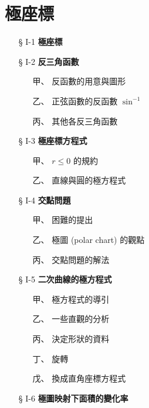 
\section{極座標}
\label{sec:b5-ch1}

\begin{center}
\begin{minipage}{0.75\textwidth}
\begin{itemize}[leftmargin=2em, itemsep=0.3em]
  \item[§ I-1] \textbf{極座標}
  \item[§ I-2] \textbf{反三角函數}
  \begin{itemize}[leftmargin=2em, itemsep=0.2em]
    \item[甲、] 反函數的用意與圖形
    \item[乙、] 正弦函數的反函數 $\sin^{-1}$
    \item[丙、] 其他各反三角函數
  \end{itemize}
  \item[§ I-3] \textbf{極座標方程式}
  \begin{itemize}[leftmargin=2em, itemsep=0.2em]
    \item[甲、] $r \le 0$ 的規約
    \item[乙、] 直線與圓的極方程式
  \end{itemize}
  \item[§ I-4] \textbf{交點問題}
  \begin{itemize}[leftmargin=2em, itemsep=0.2em]
    \item[甲、] 困難的提出
    \item[乙、] 極圖 (polar chart) 的觀點
    \item[丙、] 交點問題的解法
  \end{itemize}
  \item[§ I-5] \textbf{二次曲線的極方程式}
  \begin{itemize}[leftmargin=2em, itemsep=0.2em]
    \item[甲、] 極方程式的導引
    \item[乙、] 一些直觀的分析
    \item[丙、] 決定形狀的資料
    \item[丁、] 旋\quad 轉
    \item[戊、] 換成直角座標方程式
  \end{itemize}
  \item[§ I-6] \textbf{極圖映射下面積的變化率}
\end{itemize}
\end{minipage}
\end{center}

